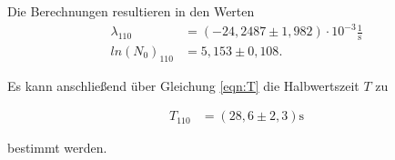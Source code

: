 Die Berechnungen resultieren in den Werten
\begin{align*}
  \lambda_{110} &= (-24,2487 \pm 1,982) \cdot 10^{-3} \frac{1}{\si{\second}} \\
  ln(N_0)_{110} &=  5,153 \pm 0,108.
\end{align*}

Es kann anschließend über Gleichung \eqref{eqn:T} die Halbwertszeit $T$ zu

\begin{align*}
  T_{110} &= (28,6 \pm 2,3) \si{\second}
\end{align*}

bestimmt werden.
